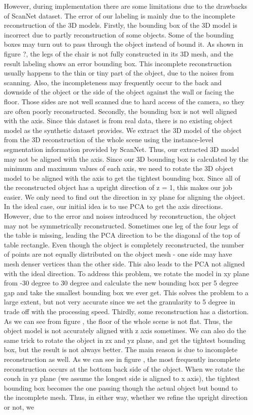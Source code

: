 However, during implementation there are some limitations due to the drawbacks of ScanNet dataset. The error of our labeling is mainly due to the incomplete reconstruction of the 3D models. Firstly, the bounding box of the 3D model is incorrect due to partly reconstruction of some objects. Some of the bounding boxes may turn out to pass through the object instead of bound it. As shown in figure ?, the legs of the chair is not fully constructed in its 3D mesh, and the result labeling shows an error bounding box. This incomplete reconstruction usually happens to the thin or tiny part of the object, due to the noises from scanning. Also, the incompleteness may frequently occur to the back and downside of the object or the side of the object against the wall or facing the floor. Those sides are not well scanned due to hard access of the camera, so they are often poorly reconstructed. Secondly, the bounding box is not well aligned with the axis. Since this dataset is from real data, there is no existing object model as the synthetic dataset provides. We extract the 3D model of the object from the 3D reconstruction of the whole scene using the instance-level segmentation information provided by ScanNet. Thus, our extracted 3D model may not be aligned with the axis. Since our 3D bounding box is calculated by the minimum and maximum values of each axis, we need to rotate the 3D object model to be aligned with the axis to get the tightest bounding box. Since all of the reconstructed object has a upright direction of z = 1, this makes our job easier. We only need to find out the direction in xy plane for aligning the object. In the ideal case, our initial idea is to use PCA to get the axis directions. However, due to the error and noises introduced by reconstruction, the object may not be symmetrically reconstructed. Sometimes one leg of the four legs of the table is missing, leading the PCA direction to be the diagonal of the top of table rectangle. Even though the object is completely reconstructed, the number of points are not equally distributed on the object mesh - one side may have mesh denser vertices than the other side. This also leads to the PCA not aligned with the ideal direction. To address this problem, we rotate the model in xy plane from -30 degree to 30 degree and calculate the new bounding box per 5 degree gap and take the smallest bounding box we ever get. This solves the problem to a large extent, but not very accurate since we set the granularity to 5 degree in trade off with the processing speed. Thirdly, some reconstruction has a distortion. As we can see from figure , the floor of the whole scene is not flat. Thus, the object model is not accurately aligned with z axis sometimes. We can also do the same trick to rotate the object in zx and yz plane, and get the tightest bounding box, but the result is not always better. The main reason is due to incomplete reconstruction as well. As we can see in figure , the most frequently incomplete reconstruction occurs at the bottom back side of the object. When we rotate the couch in yz plane (we assume the longest side is aligned to x axis), the tightest bounding box becomes the one passing though the actual object but bound to the incomplete mesh. Thus, in either way, whether we refine the upright direction or not, we 